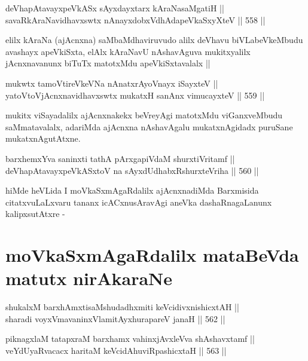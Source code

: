 \begin{shl}
deVhapAtavayxpeVkASx sAyxdayxtarx kAraNasaMgatiH || \\
savaRkAraNavidhavxswtx nAnayxdobxVdhAdapeVkaSxyXteV ||  558 ||  
\end{shl}

\begin{artha}
elilx kAraNa (ajAcnxna) saMbaMdhaviruvudo alilx deVhavu
biVLabeVkeMbudu avashayx apeVkiSxta, elAlx kAraNavU nAshavAguva
mukitxyalilx jAcnxnavanunx biTuTx matotxMdu apeVkiSxtavalalx || 
\end{artha}

\begin{shl}
mukwtx tamoVtireVkeVNa nAnatxrAyoV\s nayx iSayxteV || \\
yatoV\s toV\s jAcnxnavidhavxswtx mukatxH sanAnx vimucayxteV ||  559 ||  
\end{shl}

\begin{artha}
mukitx viSayadalilx ajAcnxnakekx beVreyAgi matotxMdu viGanxveMbudu
saMmatavalalx, adariMda ajAcnxna nAshavAgalu mukatxnAgidadx puruSane mukatxnAgutAtxne.
\end{artha}


\begin{shl}
barxhemxYva saninxti tathA pArxgapiVdaM shurxtiVritamf || \\
deVhapAtavayxpeVkASx\s toV na sAyxdUdhabxRshurxteVriha ||  560 ||  
\end{shl}

\begin{artha}
hiMde heVLida I moVkaSxmAgaRdalilx ajAcnxnadiMda Barxmisida
citatxvuLaLxvaru tananx icACxnusAravAgi aneVka dashaRnagaLanunx
kalipxsutAtxre -
\end{artha}

\section*{moVkaSxmAgaRdalilx mataBeVda matutx nirAkaraNe}


\begin{shl}
shukalxM barxhAmxtisaMshudadhxmiti keVcidivxnishicxtAH || \\
sharadi voyxVmavaninxVlamitAyxhurapareV janaH ||  562 ||  
\end{shl}
				
\begin{shl}
piknagxlaM tatapxraM barxhamx vahinxjAvxleVva shAshavxtamf || \\
veYdUyaRvacacx haritaM keVcidAhuviRpashicxtaH ||  563 ||  
\end{shl}
				
